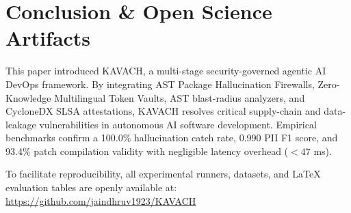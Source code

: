 \documentclass[conference]{IEEEtran}
\begin{document}
\section{Conclusion \& Open Science Artifacts}
This paper introduced KAVACH, a multi-stage security-governed agentic AI DevOps framework. By integrating AST Package Hallucination Firewalls, Zero-Knowledge Multilingual Token Vaults, AST blast-radius analyzers, and CycloneDX SLSA attestations, KAVACH resolves critical supply-chain and data-leakage vulnerabilities in autonomous AI software development. Empirical benchmarks confirm a 100.0\% hallucination catch rate, 0.990 PII F1 score, and 93.4\% patch compilation validity with negligible latency overhead ($<47$ ms).

To facilitate reproducibility, all experimental runners, datasets, and LaTeX evaluation tables are openly available at: \\
\url{https://github.com/jaindhruv1923/KAVACH}



\end{document}
